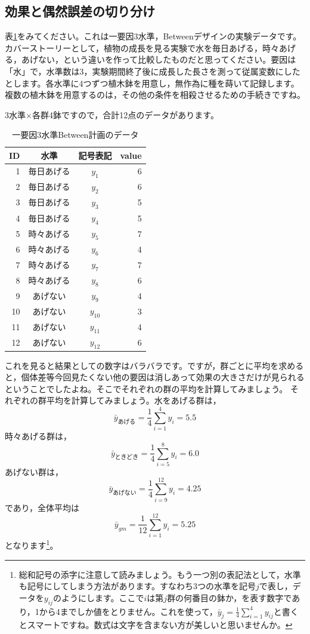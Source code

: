 \documentclass{ltjbook}
\begin{document}
\subsection{効果と偶然誤差の切り分け}
\label{generalLinear}
表\ref{table::12_02}をみてください。これは一要因3水準，Betweenデザインの実験データです。カバーストーリーとして，植物の成長を見る実験で水を毎日あげる，時々あげる，あげない，という違いを作って比較したものだと思ってください。要因は「水」で，水準数は3，実験期間終了後に成長した長さを測って従属変数にしたとします。各水準に4つずつ植木鉢を用意し，無作為に種を蒔いて記録します。複数の植木鉢を用意するのは，その他の条件を相殺させるための手続きですね。

3水準$\times$各群4鉢ですので，合計12点のデータがあります。

\begin{table}[ht]
	\centering
	\caption{一要因3水準Between計画のデータ}
	\begin{tabular}{rccr}
		\hline
		ID & 水準    & 記号表記     & value \\
		\hline
		1  & 毎日あげる & $y_{1}$  & 6     \\
		2  & 毎日あげる & $y_{2}$  & 6     \\
		3  & 毎日あげる & $y_{3}$  & 5     \\
		4  & 毎日あげる & $y_{4}$  & 5     \\
		5  & 時々あげる & $y_{5}$  & 7     \\
		6  & 時々あげる & $y_{6}$  & 4     \\
		7  & 時々あげる & $y_{7}$  & 7     \\
		8  & 時々あげる & $y_{8}$  & 6     \\
		9  & あげない  & $y_{9}$  & 4     \\
		10 & あげない  & $y_{10}$ & 3     \\
		11 & あげない  & $y_{11}$ & 4     \\
		12 & あげない  & $y_{12}$ & 6     \\
		\hline
	\end{tabular}
	\label{table::12_02}
\end{table}

これを見ると結果としての数字はバラバラです。ですが，群ごとに平均を求めると，個体差等今回見たくない他の要因は消しあって効果の大きさだけが見られるということでしたよね。そこでそれぞれの群の平均を計算してみましょう。
それぞれの群平均を計算してみましょう。水をあげる群は，
\[ \bar{y}_{あげる} =\frac{1}{4}\sum_{i=1}^4 y_i = 5.5\]
時々あげる群は，
\[ \bar{y}_{ときどき} = \frac{1}{4}\sum_{i=5}^8 y_i = 6.0 \]
あげない群は，
\[ \bar{y}_{あげない} = \frac{1}{4}\sum_{i=9}^{12} y_i = 4.25\]
であり，全体平均は
\[ \bar{y}_{gm}= \frac{1}{12}\sum_{i=1}^{12} y_i = 5.25 \]
となります\footnote{総和記号の添字に注意して読みましょう。もう一つ別の表記法として，水準も記号にしてしまう方法があります。すなわち3つの水準を記号$j$で表し，データを$y_{ij}$のようにします。ここで$i$は第$j$群の何番目の鉢か，を表す数字であり，1から4までしか値をとりません。これを使って，$\bar{y}_j = \frac{1}{4}\sum_{i=1}^4 y_{ij}$と書くとスマートですね。数式は文字を含まない方が美しいと思いませんか。}。
\end{document}
